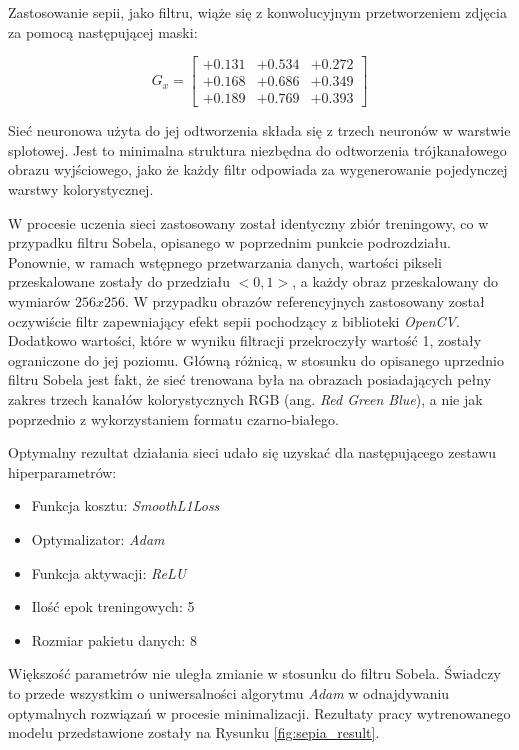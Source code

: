     Zastosowanie sepii, jako filtru, wiąże się z konwolucyjnym przetworzeniem
    zdjęcia za pomocą następującej maski:

    \[G_x =
    \begin{bmatrix}
    +0.131 & +0.534 & +0.272 \\
    +0.168 & +0.686 & +0.349 \\
    +0.189 & +0.769 & +0.393
    \end{bmatrix}
    \]

    Sieć neuronowa użyta do jej odtworzenia składa się z trzech neuronów w
    warstwie splotowej. Jest to minimalna struktura niezbędna do odtworzenia
    trójkanałowego obrazu wyjściowego, jako że każdy filtr odpowiada za wygenerowanie
    pojedynczej warstwy kolorystycznej.

    W procesie uczenia sieci zastosowany został identyczny zbiór treningowy, co w
    przypadku filtru Sobela, opisanego w poprzednim punkcie podrozdziału. Ponownie, w ramach
    wstępnego przetwarzania danych, wartości pikseli przeskalowane zostały do przedziału
    $<0,1>$, a każdy obraz przeskalowany do wymiarów $256x256$. W przypadku obrazów
    referencyjnych zastosowany został oczywiście filtr zapewniający efekt sepii
    pochodzący z biblioteki \textit{OpenCV}. Dodatkowo wartości, które w wyniku filtracji
    przekroczyły wartość 1, zostały ograniczone do jej poziomu. Główną różnicą, w stosunku
    do opisanego uprzednio filtru Sobela jest fakt, że sieć trenowana była na
    obrazach posiadających pełny zakres trzech kanałów kolorystycznych RGB
    (ang. \textit{Red Green Blue}), a nie jak
    poprzednio z wykorzystaniem formatu czarno-białego.

    Optymalny rezultat działania sieci udało się uzyskać dla następującego
    zestawu hiperparametrów:

    \begin{itemize}
    \item Funkcja kosztu: \textit{SmoothL1Loss}
    \item Optymalizator: \textit{Adam}
    \item Funkcja aktywacji: \textit{ReLU}
    \item Ilość epok treningowych: 5
    \item Rozmiar pakietu danych: 8
    \end{itemize}

    Większość parametrów nie uległa zmianie w stosunku do filtru Sobela. Świadczy to
    przede wszystkim o uniwersalności algorytmu \textit{Adam} w odnajdywaniu optymalnych
    rozwiązań w procesie minimalizacji. Rezultaty pracy wytrenowanego modelu przedstawione
    zostały na Rysunku \ref{fig:sepia_result}.

